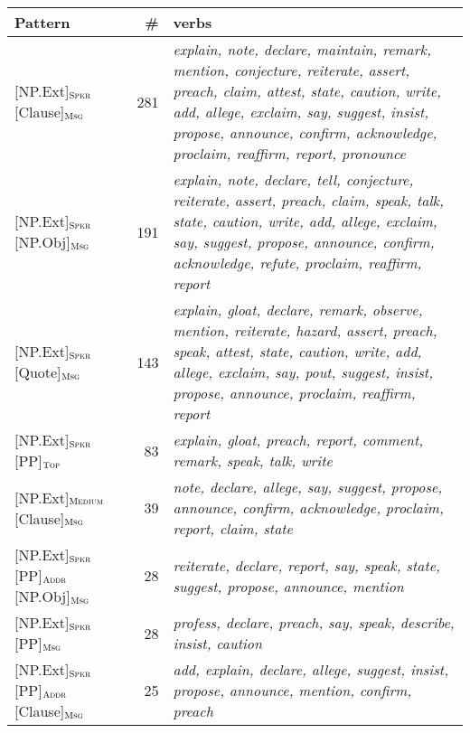 \documentclass[output=paper,colorlinks,citecolor=brown]{langscibook}
\begin{document}
\begin{table}[t]
    \centering\footnotesize
    \begin{tabularx}{\textwidth}{ lrQ }
\lsptoprule
         Pattern  & \#  & verbs \\
\midrule
{[NP.Ext]}$_{\text{\textsc{Spkr}}}$ {[Clause]}$_{\text{\textsc{Msg}}}$  & 281 & \textit{explain, note, declare, maintain, remark, mention, conjecture, reiterate, assert, preach, claim, attest, state, caution, write, add, allege, exclaim, say, suggest, insist, propose, announce, confirm, acknowledge, proclaim, reaffirm, report, pronounce}\\
{[NP.Ext]}$_{\text{\textsc{Spkr}}}$ {[NP.Obj]}$_{\text{\textsc{Msg}}}$  & 191 & \textit{explain, note, declare, tell, conjecture, reiterate, assert, preach, claim, speak, talk, state, caution, write, add, allege, exclaim, say, suggest, propose, announce, confirm, acknowledge, refute, proclaim, reaffirm, report}\\
{[NP.Ext]}$_{\text{\textsc{Spkr}}}$ {[Quote]}$_{\text{\textsc{Msg}}}$  & 143 & \textit{explain, gloat, declare, remark, observe, mention, reiterate, hazard, assert, preach, speak, attest, state, caution, write, add, allege, exclaim, say, pout, suggest, insist, propose, announce, proclaim, reaffirm, report}\\
{[NP.Ext]}$_{\text{\textsc{Spkr}}}$ {[PP]}$_{\text{\textsc{Top}}}$  & 83 & \textit{explain, gloat, preach, report, comment, remark, speak, talk, write}\\
{[NP.Ext]}$_{\text{\textsc{Medium}}}$ {[Clause]}$_{\text{\textsc{Msg}}}$  & 39 & \textit{note, declare, allege, say, suggest, propose, announce, confirm, acknowledge, proclaim, report, claim, state}\\
{[NP.Ext]}$_{\text{\textsc{Spkr}}}$ {[PP]}$_{\text{\textsc{Addr}}}$ {[NP.Obj]}$_{\text{\textsc{Msg}}}$  & 28 & \textit{reiterate, declare, report, say, speak, state, suggest, propose, announce, mention}\\
{[NP.Ext]}$_{\text{\textsc{Spkr}}}$ {[PP]}$_{\text{\textsc{Msg}}}$  & 28 & \textit{profess, declare, preach, say, speak, describe, insist, caution}\\
{[NP.Ext]}$_{\text{\textsc{Spkr}}}$ {[PP]}$_{\text{\textsc{Addr}}}$ {[Clause]}$_{\text{\textsc{Msg}}}$  & 25 & \textit{add, explain, declare, allege, suggest, insist, propose, announce, mention, confirm, preach}\\

\end{tabularx}
\end{table}
\end{document}
